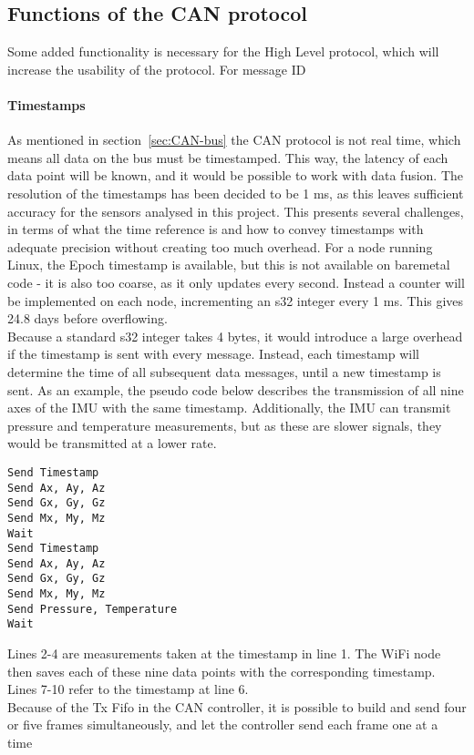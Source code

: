 \subsection{Functions of the CAN protocol}\label{sec:CAN_functions}
Some added functionality is necessary for the High Level protocol, which will increase the usability of the protocol.
For message ID 

\paragraph*{Timestamps}
As mentioned in section~\ref{sec:CAN-bus} the CAN protocol is not real time, which means all data on the bus must be timestamped. 
This way, the latency of each data point will be known, and it would be possible to work with data fusion.
The resolution of the timestamps has been decided to be 1 ms, as this leaves sufficient accuracy for the sensors analysed in this project.
This presents several challenges, in terms of what the time reference is and how to convey timestamps with adequate precision without creating too much overhead. 
For a node running Linux, the Epoch timestamp is available, but this is not available on baremetal code - it is also too coarse, as it only updates every second.
Instead a counter will be implemented on each node, incrementing an s32 integer every 1 ms.
This gives 24.8 days before overflowing.\\

Because a standard s32 integer takes 4 bytes, it would introduce a large overhead if the timestamp is sent with every message. 
Instead, each timestamp will determine the time of all subsequent data messages, until a new timestamp is sent. 
As an example, the pseudo code below describes the transmission of all nine axes of the IMU with the same timestamp.
Additionally, the IMU can transmit pressure and temperature measurements, but as these are slower signals, they would be transmitted at a lower rate.

\begin{lstlisting}
Send Timestamp
Send Ax, Ay, Az
Send Gx, Gy, Gz
Send Mx, My, Mz
Wait
Send Timestamp
Send Ax, Ay, Az
Send Gx, Gy, Gz
Send Mx, My, Mz
Send Pressure, Temperature
Wait
\end{lstlisting}

Lines 2-4 are measurements taken at the timestamp in line 1.
The WiFi node then saves each of these nine data points with the corresponding timestamp.
Lines 7-10 refer to the timestamp at line 6.\\
Because of the Tx Fifo in the CAN controller, it is possible to build and send four or five frames simultaneously, and let the controller send each frame one at a time


